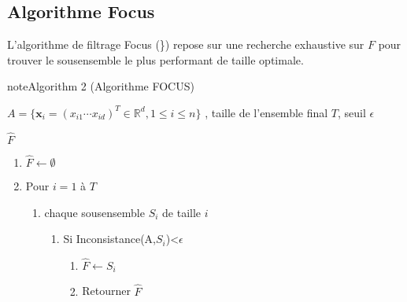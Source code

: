 \documentclass[letterpaper,10pt,french]{sphinxmanual}
\begin{document}
\subsection{Algorithme Focus}
\label{\detokenize{selection:algorithme-focus}}
\sphinxAtStartPar
L’algorithme de filtrage Focus ({\hyperref[\detokenize{selection:FOCUS}]{}}\}) repose sur une recherche exhaustive sur \(F\) pour trouver le sous\sphinxhyphen{}ensemble le plus performant de taille optimale.
\label{selection:FOCUS}
\begin{sphinxadmonition}{note}{Algorithm 2 (Algorithme FOCUS)}



\sphinxAtStartPar
{} \(A= \{\mathbf x_i=\left (x_{i1} \cdots x_{id} \right )^T\in\mathbb{R}^d,1\leq i\leq n  \}\) , taille de l’ensemble final  \(T\), seuil \(\epsilon\)

\sphinxAtStartPar
{} \(\hat{F}\)
\begin{enumerate}
%
\item {} 
\sphinxAtStartPar
\(\hat{F}\leftarrow \emptyset\)

\item {} 
\sphinxAtStartPar
Pour \(i=1\) à \( T\)
\begin{enumerate}
%
\item {} 
\sphinxAtStartPar
chaque sous\sphinxhyphen{}ensemble \(S_i\) de taille \(i\)
\begin{enumerate}
%
\item {} 
\sphinxAtStartPar
Si Inconsistance(A,\(S_i\))\textless{}\(\epsilon\)
\begin{enumerate}
%
\item {} 
\sphinxAtStartPar
\(\hat{F}\leftarrow S_i\)

\item {} 
\sphinxAtStartPar
Retourner \(\hat{F}\)

\end{enumerate}

\end{enumerate}

\end{enumerate}

\end{enumerate}
\end{sphinxadmonition}
\end{document}
